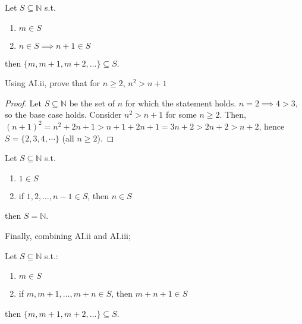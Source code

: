 \documentclass[12pt]{article}
\begin{document}
\begin{axiom}[AI.ii]
  Let $S \subseteq \mathbb{N}$ s.t.
  \begin{enumerate}[label=(\alph*)]
    \item $m \in S$
    \item $n \in S \implies n+1 \in S$
  \end{enumerate}
  then $\{m, m+1, m+2, \dots\} \subseteq S$.
\end{axiom}

\begin{example}
  Using AI.ii, prove that for $n \geq 2$, $n^2 > n+1$
\end{example}

\begin{proof}
  Let $S \subseteq \mathbb{N}$ be the set of $n$ for which the statement holds. $n = 2 \implies 4 > 3$, so the base case holds. Consider $n^2 > n +1$ for some $n \geq 2$. Then, $(n+1)^2 = n^2 + 2n + 1 > n+1 + 2n + 1 = 3n + 2 > 2n + 2 > n + 2$, hence $S = \{2,3,4, \cdots \}$ (all $n \geq 2$).
\end{proof}

\begin{axiom}\label{axiom:inductioniii}
  Let $S \subseteq \mathbb{N}$ s.t.
  \begin{enumerate}[label=(\alph*)]
    \item $1 \in S$
    \item if $1, 2, \dots, n -1 \in S$, then $n \in S$
  \end{enumerate}
  then $S = \mathbb{N}$.
\end{axiom}

Finally, combining AI.ii and AI.iii;
\begin{axiom}[AI.iv]
  Let $S \subseteq \mathbb{N}$ s.t.:
  \begin{enumerate}[label=(\alph*)]
    \item $m \in S$
    \item if $m, m + 1, \dots, m + n \in S$, then $m + n + 1 \in S$
  \end{enumerate}
  then $\{m, m+1, m+2, \dots\} \subseteq S$.
\end{axiom}
\end{document}
